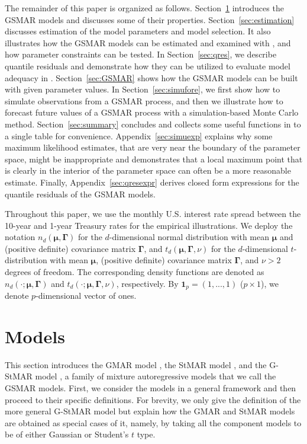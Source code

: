 \documentclass[nojss]{jss} %
\begin{document}
The remainder of this paper is organized as follows. Section~\ref{sec:models} introduces the GSMAR models and discusses some of their properties. Section~\ref{sec:estimation} discusses estimation of the model parameters and model selection. It also illustrates how the GSMAR models can be estimated and examined with , and how parameter constraints can be tested. In Section~\ref{sec:qres}, we describe quantile residuals and demonstrate how they can be utilized to evaluate model adequacy in . Section~\ref{sec:GSMAR} shows how the GSMAR models can be built with given parameter values. In Section~\ref{sec:simufore}, we first show how to simulate observations from a GSMAR process, and then we illustrate how to forecast future values of a GSMAR process with a simulation-based Monte Carlo method. Section~\ref{sec:summary} concludes and collects some useful functions in  to a single table for convenience. Appendix~\ref{sec:simuexp} explains why some maximum likelihood estimates, that are very near the boundary of the parameter space, might be inappropriate and demonstrates that a local maximum point that is clearly in the interior of the parameter space can often be a more reasonable estimate. Finally, Appendix~\ref{sec:qresexpr} derives closed form expressions for the quantile residuals of the GSMAR models.

Throughout this paper, we use the monthly U.S. interest rate spread between the 10-year and 1-year Treasury rates for the empirical illustrations. We deploy the notation $n_d(\boldsymbol{\mu},\boldsymbol{\Gamma})$ for the $d$-dimensional normal distribution with mean $\boldsymbol{\mu}$ and (positive definite) covariance matrix $\boldsymbol{\Gamma}$, and $t_d(\boldsymbol{\mu},\boldsymbol{\Gamma},\nu)$ for the $d$-dimensional $t$-distribution with mean $\boldsymbol{\mu}$, (positive definite) covariance matrix $\boldsymbol{\Gamma}$, and $\nu>2$ degrees of freedom. The corresponding density functions are denoted as $n_d(\cdot;\boldsymbol{\mu},\boldsymbol{\Gamma})$ and $t_d(\cdot;\boldsymbol{\mu},\boldsymbol{\Gamma},\nu)$, respectively. By $\boldsymbol{1}_p=(1,...,1)$ ($p \times 1$), we denote $p$-dimensional vector of ones.


\section{Models}\label{sec:models}
This section introduces the GMAR model \citep{Kalliovirta+Meitz+Saikkonen:2015}, the StMAR model \citep{Meitz+Preve+Saikkonen:2021}, and the G-StMAR model \citep{Virolainen:2020}, a family of mixture autoregressive models that we call the GSMAR models. First, we consider the models in a general framework and then proceed to their specific definitions. For brevity, we only give the definition of the more general G-StMAR model but explain how the GMAR and StMAR models are obtained as special cases of it, namely, by taking all the component models to be of either Gaussian or Student's $t$ type.
\end{document}

